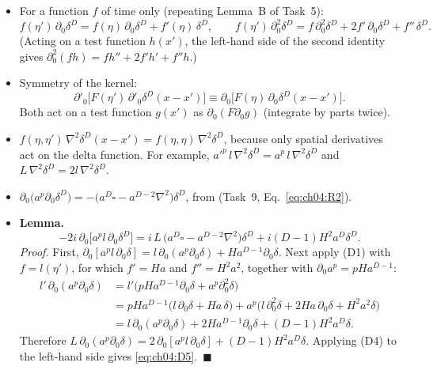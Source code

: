 \begin{itemize}[leftmargin=1.5em,itemsep=4pt]
\item[(D1)] For a function $f$ of time only (repeating Lemma~B of Task~5):
\begin{equation}
f(\eta')\,\partial_0\delta^D=f(\eta)\,\partial_0\delta^D+f'(\eta)\,\delta^D,\qquad
f(\eta')\,\partial_0^2\delta^D=f\,\partial_0^2\delta^D+2f'\,\partial_0\delta^D+f''\,\delta^D .
\label{eq:ch04:D1}
\end{equation}
(Acting on a test function $h(x')$, the left-hand side of the second identity gives $\partial_0^2(fh)=fh''+2f'h'+f''h$.)
\item[(D2)] Symmetry of the kernel:
\begin{equation}
\partial'_0\big[F(\eta')\,\partial'_0\delta^D(x-x')\big]\equiv\partial_0\big[F(\eta)\,\partial_0\delta^D(x-x')\big].
\label{eq:ch04:D2}
\end{equation}
Both act on a test function $g(x')$ as $\partial_0(F\partial_0g)$ (integrate by parts twice).
\item[(D3)] $f(\eta,\eta')\,\nabla^2\delta^D(x-x')=f(\eta,\eta)\,\nabla^2\delta^D$, because only spatial derivatives act on the delta function.
For example, $a'^p\,l\,\nabla^2\delta^D=a^p\,l\,\nabla^2\delta^D$ and $L\,\nabla^2\delta^D=2l\,\nabla^2\delta^D$.
\item[(D4)] $\partial_0\big(a^p\partial_0\delta^D\big)=-\big(a^D\square-a^{D-2}\nabla^2\big)\delta^D$, from  (Task~9, Eq.~\eqref{eq:ch04:R2}).
\item[(D5)] \textbf{Lemma.}
\begin{equation}
-2i\,\partial_0\big[a^p l\,\partial_0\delta^D\big]=i\,L\,\big(a^D\square-a^{D-2}\nabla^2\big)\delta^D+i(D-1)H^2a^D\delta^D .
\label{eq:ch04:D5}
\end{equation}
\emph{Proof.} First, $\partial_0[a^pl\,\partial_0\delta]=l\,\partial_0(a^p\partial_0\delta)+Ha^{D-1}\partial_0\delta$.
Next apply (D1) with $f=l(\eta')$, for which $f'=Ha$ and $f''=H^2a^2$, together with $\partial_0a^p=pHa^{D-1}$:
\begin{equation}
\begin{aligned}
l'\,\partial_0(a^p\partial_0\delta)&=l'\big(pHa^{D-1}\partial_0\delta+a^p\partial_0^2\delta\big)\\
&=pHa^{D-1}\big(l\,\partial_0\delta+Ha\,\delta\big)+a^p\big(l\,\partial_0^2\delta+2Ha\,\partial_0\delta+H^2a^2\delta\big)\\
&=l\,\partial_0(a^p\partial_0\delta)+2Ha^{D-1}\partial_0\delta+(D-1)H^2a^D\delta .
\end{aligned}
\end{equation}
Therefore $L\,\partial_0(a^p\partial_0\delta)=2\,\partial_0[a^pl\,\partial_0\delta]+(D-1)H^2a^D\delta$.
Applying (D4) to the left-hand side gives \eqref{eq:ch04:D5}.~$\blacksquare$
\end{itemize}

